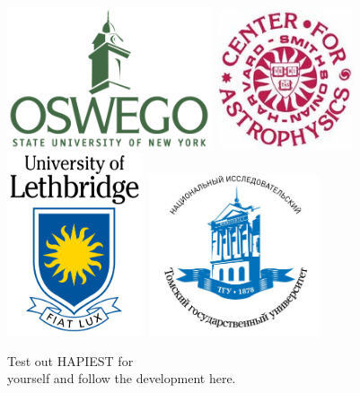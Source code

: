 \documentclass[a0,landscape]{a0poster}
\begin{document}
\begin{minipage}[b]{0.18\linewidth}
\begin{center}
\includegraphics[width=6cm]{OswegoLogo}\
\includegraphics[width=4cm]{HitranLogo}\
\includegraphics[width=4cm]{LethbridgeLogo}\
\includegraphics[width=5cm]{TomskLogo}\
\begin{minipage}{0.5\linewidth}\centering
Test out HAPIEST for\\
yourself and follow the development here.
\end{minipage}
\hfill
\begin{minipage}{.45\linewidth}

\end{minipage}
\end{center}
\end{minipage}
\end{document}
